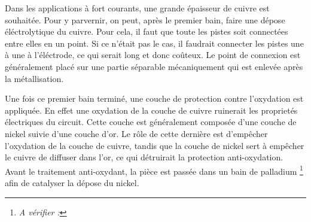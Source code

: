 Dans les applications à fort courants, une grande épaisseur de cuivre est souhaitée.
Pour y parvernir, on peut, après le premier bain, faire une dépose éléctrolytique du cuivre.
Pour cela, il faut que toute les pistes soit connectées entre elles en un point.
Si ce n'était pas le cas, il faudrait connecter les pistes une à une à l'éléctrode, ce qui serait long et donc coûteux.
Le point de connexion est généralement placé sur une partie séparable mécaniquement qui est enlevée après la métallisation.

Une fois ce premier bain terminé, une couche de protection contre l'oxydation est appliquée.
En effet une oxydation de la couche de cuivre ruinerait les proprietés électriques du circuit.
Cette couche est généralement composée d'une couche de nickel suivie d'une couche d'or.
Le rôle de cette dernière est d'empêcher l'oxydation de la couche de cuivre, tandis que la couche de nickel sert à empêcher le cuivre de diffuser dans l'or, ce qui détruirait la protection anti-oxydation.
Avant le traitement anti-oxydant, la pièce est passée dans un bain de palladium \footnote{\emph{A vérifier :} } afin de catalyser la dépose du nickel.
